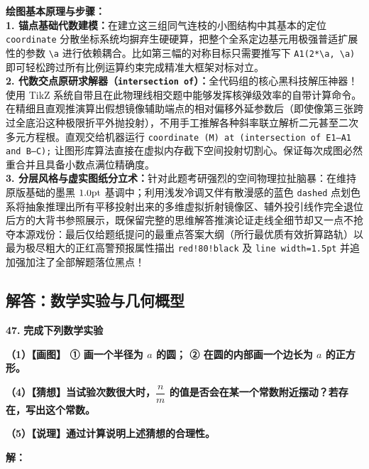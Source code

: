 {\small\color{blue!70!black}
\textbf{绘图基本原理与步骤：}\\
\textbf{1. 锚点基础代数建模：}在建立这三组同气连枝的小图结构中其基本的定位 \texttt{coordinate} 分散坐标系统均摒弃生硬硬算，把整个全系定边基元用极强普适扩展性的参数 \texttt{\textbackslash a} 进行依赖耦合。比如第三幅的对称目标只需要推写下 \texttt{A1(2*\textbackslash a, \textbackslash a)} 即可轻松跨过所有比例运算约束完成精准大框架对标对立。\\
\textbf{2. 代数交点原研求解器（\texttt{intersection of}）：}全代码组的核心黑科技解压神器！使用 TikZ 系统自带且在此物理线相交题中能够发挥核弹级效率的自带计算命令。在精细且直观推演算出假想镜像辅助端点的相对偏移外延参数后（即使像第三张跨过全底沿这种极限折平外抛投射），不用手工推解各种斜率联立解析二元甚至二次多元方程根。直观交给机器运行 \texttt{coordinate (M) at (intersection of E1--A1 and B--C);} 让图形库算法直接在虚拟内存截下空间投射切割心。保证每次成图必然重合并且具备小数点满位精确度。\\
\textbf{3. 分层风格与虚实图纸分立术：}针对此题考研强烈的空间物理拉扯脑暴：在维持原版基础的墨黑 $1.0\rm{pt}$ 基调中；利用浅发冷调又伴有散漫感的蓝色 \texttt{dashed} 点划色系将抽象推理出所有平移投射出来的多维虚拟折射镜像区、辅外投引线作完全退位后方的大背书参照展示，既保留完整的思维解答推演论证走线全细节却又一点不抢夺本源戏份：最后仅给题纸提问的最重点答案大纲（所行最优质有效折算路轨）以最为极尽粗大的正红高警预报属性描出 \texttt{red!80!black} 及 \texttt{line width=1.5pt} 并追加强加注了全部解题落位黑点！
}

\newpage

\newpage

\subsection{解答：数学实验与几何概型}

\vspace{0.6cm}

\textbf{\LARGE 47.} \textbf{完成下列数学实验}

\textbf{（1）【画图】 ① 画一个半径为 $a$ 的圆； ② 在圆的内部画一个边长为 $a$ 的正方形。}

\textbf{（4）【猜想】当试验次数很大时，$\dfrac{n}{m}$ 的值是否会在某一个常数附近摆动？若存在，写出这个常数。}

\textbf{（5）【说理】通过计算说明上述猜想的合理性。}

\vspace{0.4cm}
\textbf{解：}

